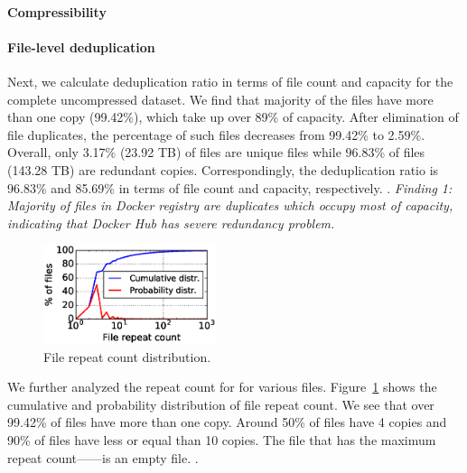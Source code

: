 
\paragraph{Compressibility}



\paragraph{File-level deduplication}
Next, we calculate deduplication ratio in terms of file count and capacity for
the complete uncompressed dataset. %
%
We find that majority of the files have more than one copy (99.42\%), which
take up over 89\% of capacity.
%
%
After elimination of file duplicates, the percentage of such files decreases
from 99.42\% to 2.59\%.  
%
%
Overall, only 3.17\% (23.92 TB) of files are unique files while 96.83\% of
files (143.28 TB) are redundant copies. 
%
Correspondingly, the deduplication ratio is 96.83\% and 85.69\% in terms of
file count and capacity, respectively.
%
.
%
%
\textit{Finding 1: Majority of files in Docker registry are duplicates which
occupy most of capacity, indicating that Docker Hub has severe redundancy
problem.}

%


\begin{figure} \centering
	\includegraphics[width=0.45\textwidth]{graphs/File_repeat_count.eps}
	\caption{File repeat count distribution.  } \label{fig:file-repeat-cnt}
\end{figure}

We further analyzed the repeat count for for various files.
%
Figure~\ref{fig:file-repeat-cnt} shows the cumulative and probability
distribution of file repeat count.  
%
We see that over 99.42\% of files have more than one copy.
%
Around 50\% of files have 4 copies and 90\% of files have less or equal than 10
copies. 
%
The file that has the maximum repeat count------is an empty file.
%
.
